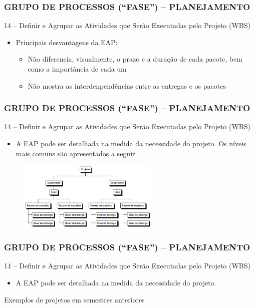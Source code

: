 \begin{frame}
 \frametitle{GRUPO DE PROCESSOS (“FASE”) – PLANEJAMENTO}
   14 – Definir e Agrupar as Atividades que Serão Executadas pelo Projeto (WBS)
  \begin{itemize}
   \item Principais desvantagens da EAP:
   \begin{itemize}
    \item Não diferencia, visualmente, o prazo e a duração de cada pacote, bem como a importância de cada um
    \item Não mostra as interdenpendências entre as entregas e os pacotes
   \end{itemize}
  \end{itemize}
\end{frame}

\begin{frame}
 \frametitle{GRUPO DE PROCESSOS (“FASE”) – PLANEJAMENTO}
   14 – Definir e Agrupar as Atividades que Serão Executadas pelo Projeto (WBS)
  \begin{itemize}
   \item A EAP pode ser detalhada na medida da necessidade do projeto. Os níveis mais comuns são apresentados a seguir
  \end{itemize}
  \begin{figure}
   \centering
   \includegraphics[width = 0.6\textwidth]{figs/fig1.png}
  \end{figure}
\end{frame}

\begin{frame}
 \frametitle{GRUPO DE PROCESSOS (“FASE”) – PLANEJAMENTO}
   14 – Definir e Agrupar as Atividades que Serão Executadas pelo Projeto (WBS)
  \begin{itemize}
   \item A EAP pode ser detalhada na medida da necessidade do projeto. 
  \end{itemize}
  Exemplos de projetos em semestres anteriores
\end{frame}

